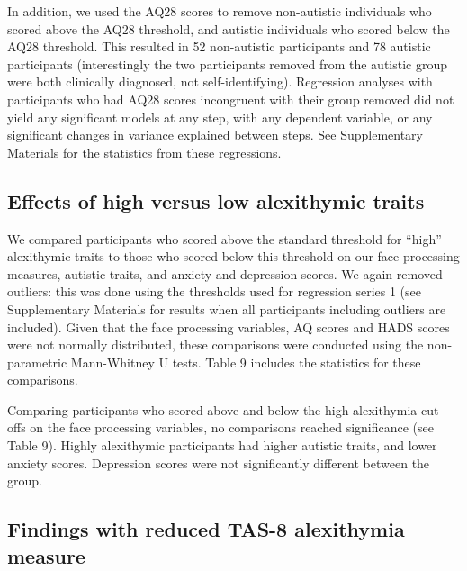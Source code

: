 \documentclass[
]{article}
\begin{document}
In addition, we used the AQ28 scores to remove non-autistic individuals who scored above the AQ28 threshold, and autistic individuals who scored below the AQ28 threshold. This resulted in 52 non-autistic participants and 78 autistic participants (interestingly the two participants removed from the autistic group were both clinically diagnosed, not self-identifying). Regression analyses with participants who had AQ28 scores incongruent with their group removed did not yield any significant models at any step, with any dependent variable, or any significant changes in variance explained between steps. See Supplementary Materials for the statistics from these regressions.

\hypertarget{effects-of-high-versus-low-alexithymic-traits}{%
\subsection*{Effects of high versus low alexithymic traits}\label{effects-of-high-versus-low-alexithymic-traits}}

We compared participants who scored above the standard threshold for ``high'' alexithymic traits to those who scored below this threshold on our face processing measures, autistic traits, and anxiety and depression scores. We again removed outliers: this was done using the thresholds used for regression series 1 (see Supplementary Materials for results when all participants including outliers are included). Given that the face processing variables, AQ scores and HADS scores were not normally distributed, these comparisons were conducted using the non-parametric Mann-Whitney U tests. Table 9 includes the statistics for these comparisons.

Comparing participants who scored above and below the high alexithymia cut-offs on the face processing variables, no comparisons reached significance (see Table 9). Highly alexithymic participants had higher autistic traits, and lower anxiety scores. Depression scores were not significantly different between the group.

\hypertarget{findings-with-reduced-tas-8-alexithymia-measure}{%
\subsection*{Findings with reduced TAS-8 alexithymia measure}\label{findings-with-reduced-tas-8-alexithymia-measure}}
\end{document}
